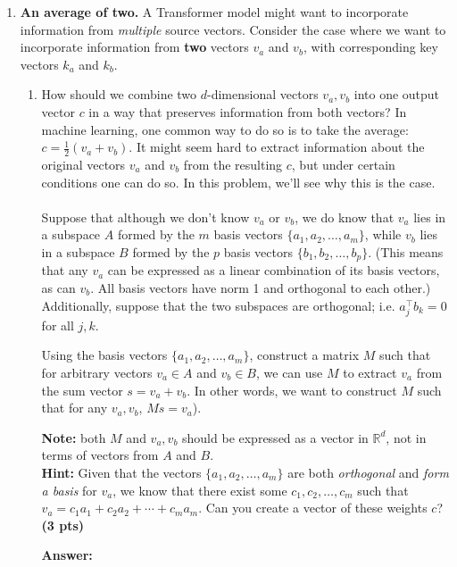 \documentclass{assignment format}
\newenvironment{answer}{
    {\bf Answer:} \begingroup\color{red}
}{\endgroup}%
\begin{document}
\begin{enumerate}[label=(\alph*)]


\item\textbf{An average of two.} 
A Transformer model might want to incorporate information from \textit{multiple} source vectors. 
Consider the case where we want to incorporate information from \textbf{two} vectors $v_a$ and $v_b$, with corresponding key vectors $k_a$ and $k_b$.
\begin{enumerate}[label=(\roman*)]
\item How should we combine two $d$-dimensional vectors $v_a, v_b$ into one output vector $c$ in a way that preserves information from both vectors? 
In machine learning, one common way to do so is to take the average: $c = \frac{1}{2} (v_a + v_b)$.
It might seem hard to extract information about the original vectors $v_a$ and $v_b$ from the resulting $c$, but under certain conditions one can do so. In this problem, we'll see why this is the case.
\\ \\
Suppose that although we don't know $v_a$ or $v_b$, we do know that $v_a$ lies in a subspace $A$ formed by the $m$ basis vectors $\{a_1, a_2, \ldots, a_m\}$, while $v_b$ lies in a subspace $B$ formed by the $p$ basis vectors $\{b_1, b_2, \ldots, b_p\}.$ (This means that any $v_a$ can be expressed as a linear combination of its basis vectors, as can $v_b$. All basis vectors have norm 1 and orthogonal to each other.)
Additionally, suppose that the two subspaces are orthogonal; i.e. $a_j^\top b_k = 0$ for all $j, k$.

Using the basis vectors $\{a_1, a_2, \ldots, a_m\}$, construct a matrix $M$ such that for arbitrary vectors $v_a \in A$ and $v_b \in B$, we can use $M$ to extract $v_a$ from the sum vector $s = v_a + v_b$. In other words, we want to construct $M$ such that for any $v_a, v_b$,  $Ms = v_a$).

\textbf{Note:} both $M$ and $v_a, v_b$ should be expressed as a vector in $\mathbb{R}^d$, not in terms of vectors from $A$ and $B$. \\

\textbf{Hint:} Given that the vectors $\{a_1, a_2, \ldots, a_m\}$ are both \textit{orthogonal} and \textit{form a basis} for $v_a$, we know that there exist some $c_1, c_2, \ldots, c_m$ such that $v_a = c_1 a_1 + c_2 a_2 + \cdots + c_m a_m$. Can you create a vector of these weights $c$? \textbf{(3 pts)}

\begin{answer}
\end{answer}


\end{enumerate}
\end{enumerate}
\end{document}
